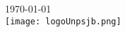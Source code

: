 \begin{titlepage}


    {\large \today}\\[1cm] %


    \texttt{[image: logoUnpsjb.png]}\\[0.5cm] %
     


\end{titlepage}
